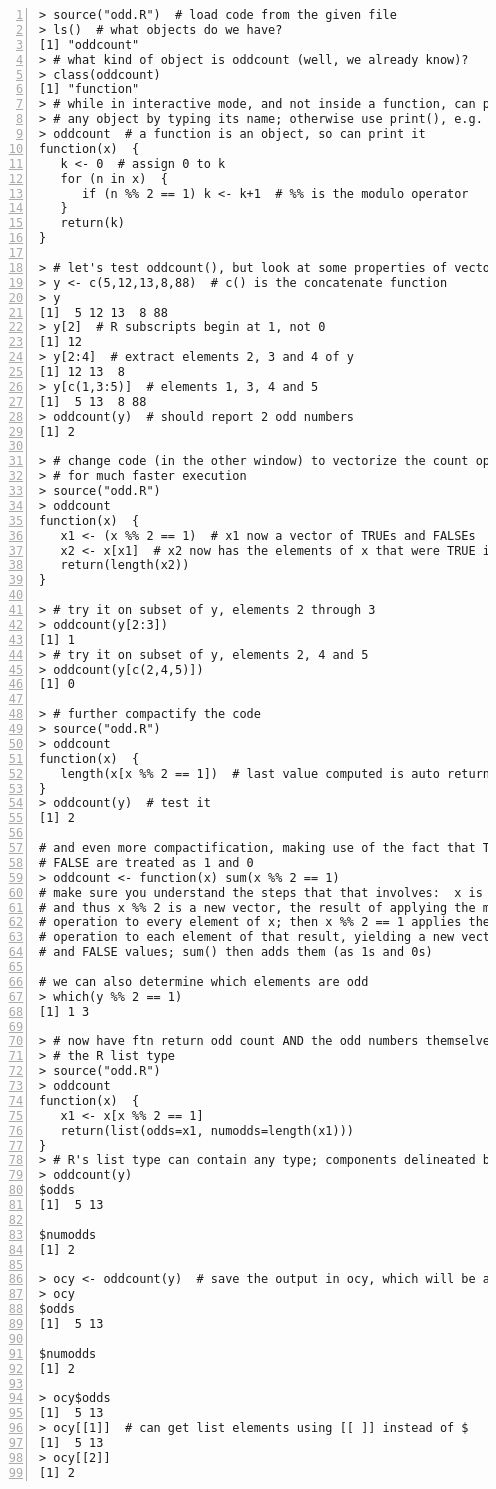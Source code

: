 \begin{lstlisting}[numbers=left]
> source("odd.R")  # load code from the given file
> ls()  # what objects do we have?
[1] "oddcount"
> # what kind of object is oddcount (well, we already know)?
> class(oddcount)
[1] "function"
> # while in interactive mode, and not inside a function, can print 
> # any object by typing its name; otherwise use print(), e.g. print(x+y)
> oddcount  # a function is an object, so can print it
function(x)  {
   k <- 0  # assign 0 to k
   for (n in x)  {
      if (n %% 2 == 1) k <- k+1  # %% is the modulo operator
   }
   return(k)
}

> # let's test oddcount(), but look at some properties of vectors first
> y <- c(5,12,13,8,88)  # c() is the concatenate function
> y
[1]  5 12 13  8 88
> y[2]  # R subscripts begin at 1, not 0
[1] 12
> y[2:4]  # extract elements 2, 3 and 4 of y
[1] 12 13  8
> y[c(1,3:5)]  # elements 1, 3, 4 and 5
[1]  5 13  8 88
> oddcount(y)  # should report 2 odd numbers
[1] 2

> # change code (in the other window) to vectorize the count operation,
> # for much faster execution
> source("odd.R")
> oddcount
function(x)  {
   x1 <- (x %% 2 == 1)  # x1 now a vector of TRUEs and FALSEs
   x2 <- x[x1]  # x2 now has the elements of x that were TRUE in x1
   return(length(x2))
}

> # try it on subset of y, elements 2 through 3
> oddcount(y[2:3])
[1] 1
> # try it on subset of y, elements 2, 4 and 5
> oddcount(y[c(2,4,5)])
[1] 0

> # further compactify the code
> source("odd.R")
> oddcount
function(x)  {
   length(x[x %% 2 == 1])  # last value computed is auto returned
}
> oddcount(y)  # test it
[1] 2

# and even more compactification, making use of the fact that TRUE and
# FALSE are treated as 1 and 0
> oddcount <- function(x) sum(x %% 2 == 1)
# make sure you understand the steps that that involves:  x is a vector,
# and thus x %% 2 is a new vector, the result of applying the mod 2
# operation to every element of x; then x %% 2 == 1 applies the == 1
# operation to each element of that result, yielding a new vector of TRUE
# and FALSE values; sum() then adds them (as 1s and 0s)

# we can also determine which elements are odd
> which(y %% 2 == 1)
[1] 1 3

> # now have ftn return odd count AND the odd numbers themselves, using
> # the R list type
> source("odd.R")
> oddcount
function(x)  {
   x1 <- x[x %% 2 == 1]
   return(list(odds=x1, numodds=length(x1)))
}
> # R's list type can contain any type; components delineated by $
> oddcount(y)
$odds
[1]  5 13

$numodds
[1] 2

> ocy <- oddcount(y)  # save the output in ocy, which will be a list
> ocy  
$odds
[1]  5 13

$numodds
[1] 2

> ocy$odds
[1]  5 13
> ocy[[1]]  # can get list elements using [[ ]] instead of $
[1]  5 13
> ocy[[2]]
[1] 2
\end{lstlisting}

